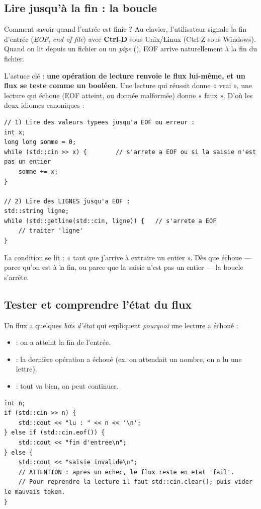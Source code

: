 \documentclass[11pt]{article}
\begin{document}
\subsection*{Lire jusqu'à la fin : la boucle }

Comment savoir quand l'entrée est finie ? Au clavier, l'utilisateur signale la
fin d'entrée (\emph{EOF}, \emph{end of file}) avec \textbf{Ctrl-D} sous
Unix/Linux (Ctrl-Z sous Windows). Quand on lit depuis un fichier ou un \emph{pipe}
(), EOF arrive naturellement à la fin du fichier.

L'astuce clé : \textbf{une opération de lecture renvoie le flux lui-même, et un
flux se teste comme un booléen}. Une lecture qui réussit donne « vrai », une
lecture qui échoue (EOF atteint, ou donnée malformée) donne « faux ». D'où les
deux idiomes canoniques :

\begin{lstlisting}
// 1) Lire des valeurs typees jusqu'a EOF ou erreur :
int x;
long long somme = 0;
while (std::cin >> x) {        // s'arrete a EOF ou si la saisie n'est pas un entier
    somme += x;
}

// 2) Lire des LIGNES jusqu'a EOF :
std::string ligne;
while (std::getline(std::cin, ligne)) {   // s'arrete a EOF
    // traiter 'ligne'
}
\end{lstlisting}

La condition  se lit : « tant que j'arrive à extraire
un entier ». Dès que \code{>>} échoue — parce qu'on est à la fin, ou parce que la
saisie n'est pas un entier — la boucle s'arrête.

\subsection*{Tester et comprendre l'état du flux}

Un flux a quelques \emph{bits d'état} qui expliquent \emph{pourquoi} une lecture
a échoué :

\begin{itemize}[noitemsep]
    \item {} : on a atteint la fin de l'entrée.
    \item {} : la dernière opération a échoué (ex. on attendait un
          nombre, on a lu une lettre).
    \item {} : tout va bien, on peut continuer.
\end{itemize}

\begin{lstlisting}
int n;
if (std::cin >> n) {
    std::cout << "lu : " << n << '\n';
} else if (std::cin.eof()) {
    std::cout << "fin d'entree\n";
} else {
    std::cout << "saisie invalide\n";
    // ATTENTION : apres un echec, le flux reste en etat 'fail'.
    // Pour reprendre la lecture il faut std::cin.clear(); puis vider le mauvais token.
}
\end{lstlisting}
\end{document}
